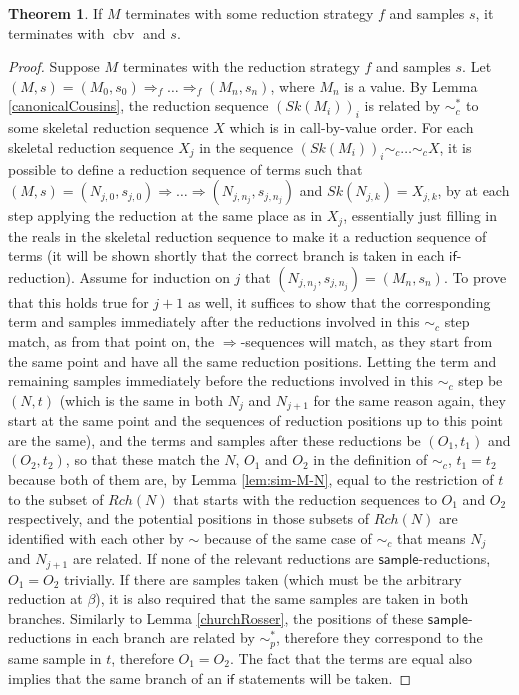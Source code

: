 \documentclass{article}
\newcommand{\tsample}{\mathsf{sample}}
\DeclareMathOperator{\cbv}{cbv}
\theoremstyle{definition}
\theoremstyle{lemma}
\newtheorem{theorem}{Theorem}
\theoremstyle{remark}
\begin{document}
\begin{theorem} \label{thm:CbvIsTerminatingest}
If $M$ terminates with some reduction strategy $f$ and samples $s$, it terminates with $\cbv$ and $s$.
\end{theorem}
\begin{proof}
  Suppose $M$ terminates with the reduction strategy $f$ and samples $s$. Let $(M,s) = (M_0,s_0) \Rightarrow_f \dots \Rightarrow_f (M_n,s_n)$, where $M_n$ is a value. By Lemma \ref{canonicalCousins}, the reduction sequence $(Sk(M_i))_i$ is related by $\sim_c^*$ to some skeletal reduction sequence $X$ which is in call-by-value order. For each skeletal reduction sequence $X_j$ in the sequence $(Sk(M_i))_i \sim_c \dots \sim_c X$, it is possible to define a reduction sequence of terms such that $(M,s) = (N_{j,0},s_{j,0}) \Rightarrow \dots \Rightarrow (N_{j,n_j},s_{j,n_j})$ and $Sk(N_{j,k}) = X_{j,k}$, by at each step applying the reduction at the same place as in $X_j$, essentially just filling in the reals in the skeletal reduction sequence to make it a reduction sequence of terms (it will be shown shortly that the correct branch is taken in each $\textsf{if}$-reduction). Assume for induction on $j$ that $(N_{j,n_j},s_{j,n_j}) = (M_n,s_n)$. To prove that this holds true for $j+1$ as well, it suffices to show that the corresponding term and samples immediately after the reductions involved in this $\sim_c$ step match, as from that point on, the $\Rightarrow$-sequences will match, as they start from the same point and have all the same reduction positions. Letting the term and remaining samples immediately before the reductions involved in this $\sim_c$ step be $(N,t)$ (which is the same in both $N_j$ and $N_{j+1}$ for the same reason again, they start at the same point and the sequences of reduction positions up to this point are the same), and the terms and samples after these reductions be $(O_1,t_1)$ and $(O_2,t_2)$, so that these match the $N$, $O_1$ and $O_2$ in the definition of $\sim_c$, $t_1 = t_2$ because both of them are, by Lemma \ref{lem:sim-M-N}, equal to the restriction of $t$ to the subset of $Rch(N)$ that starts with the reduction sequences to $O_1$ and $O_2$ respectively, and the potential positions in those subsets of $Rch(N)$ are identified with each other by $\sim$ because of the same case of $\sim_c$ that means $N_j$ and $N_{j+1}$ are related. If none of the relevant reductions are $\tsample$-reductions, $O_1 = O_2$ trivially. If there are samples taken (which must be the arbitrary reduction at $\beta$), it is also required that the same samples are taken in both branches. Similarly to Lemma \ref{churchRosser}, the positions of these $\tsample$-reductions in each branch are related by $\sim_p^*$, therefore they correspond to the same sample in $t$, therefore $O_1 = O_2$. The fact that the terms are equal also implies that the same branch of an $\textsf{if}$ statements will be taken.


\end{proof}
\end{document}
